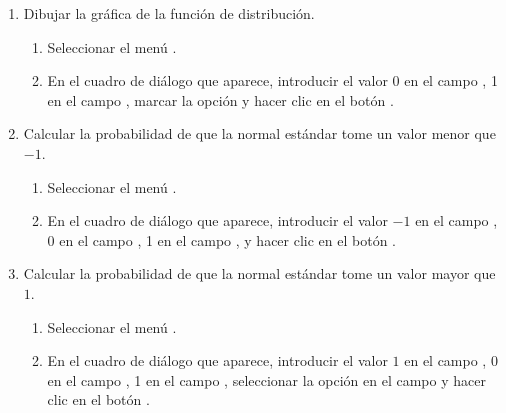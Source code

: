 \begin{enumerate}[leftmargin=*]
\begin{enumerate}
\item Dibujar la gráfica de la función de distribución. 
\begin{indicacion}{
\begin{enumerate}
\item Seleccionar el menú .
\item En el cuadro de diálogo que aparece, introducir el valor 0 en el campo , 1 en el campo
, marcar la opción  y hacer clic en el botón .
\end{enumerate}}
\end{indicacion}

\item Calcular la probabilidad de que la normal estándar tome un valor menor que $-1$. 
\begin{indicacion}{
\begin{enumerate}
\item Seleccionar el menú .
\item En el cuadro de diálogo que aparece, introducir el valor $-1$ en el campo , 0 en el campo  
, 1 en el campo , y hacer clic en el botón .
\end{enumerate}}
\end{indicacion}

\item Calcular la probabilidad de que la normal estándar tome un valor mayor que $1$. 
\begin{indicacion}{
\begin{enumerate}
\item Seleccionar el menú .
\item En el cuadro de diálogo que aparece, introducir el valor $1$ en el campo , 0 en el campo  
, 1 en el campo , seleccionar la opción  en el campo
 y hacer clic en el botón .
\end{enumerate}}
\end{indicacion}


\end{enumerate}
\end{enumerate}
